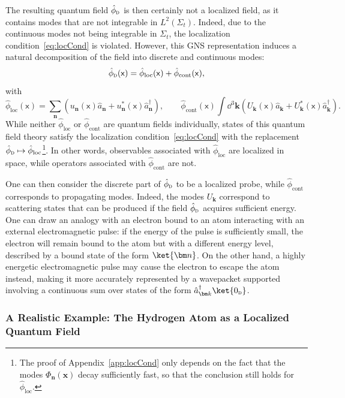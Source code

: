 \documentclass[letterpaper,12pt,titlepage,oneside,final]{book}
\newcommand{\mf}{\mathsf}%
\newcommand{\tc}[1]{\textsc{#1}}
\begin{document}
The resulting quantum field $\hat{\phi}_\tc{d}$ is then certainly not a localized field, as it contains modes that are not integrable in $L^2(\Sigma_t)$. Indeed, due to the continuous modes not being integrable in $\Sigma_t$, the localization condition~\eqref{eq:locCond} is violated. However, this GNS representation induces a natural decomposition of the field into discrete and continuous modes:
\begin{equation}
    \hat{\phi}_\tc{d}(\mf x) = \hat{\phi}_{\text{loc}}(\mf x) + \hat{\phi}_\text{cont}(\mf x),
\end{equation}
with
\begin{equation}
    \hat{\phi}_{\text{loc}}(\mf x) = \sum_{\bm n} \left(u_{\bm n}(\mf x) \hat{a}_{\bm n} + u_{\bm n}^*(\mf x) \hat{a}^\dagger_{\bm n}\right), \quad \quad \hat{\phi}_{\text{cont}}(\mf x) \int \dd^3 \bm k \left(U_{\bm k}(\mf x) \hat{a}_{\bm k} +U_{\bm k}^*(\mf x) \hat{a}^\dagger_{\bm k} \right).
\end{equation}
While neither $\hat{\phi}_\text{loc}$ or $\hat{\phi}_\text{cont}$ are quantum fields individually, states of this quantum field theory satisfy the localization condition~\eqref{eq:locCond} with the replacement $\hat{\phi}_\tc{d}\mapsto \hat{\phi}_\text{loc}$\footnote{The proof of Appendix~\ref{app:locCond} only depends on the fact that the modes $\Phi_{\bm n}(\bm x)$ decay sufficiently fast, so that the conclusion still holds for $\hat{\phi}_\text{loc}$.}. In other words, observables associated with $\hat{\phi}_\text{loc}$ are localized in space, while operators associated with $\hat{\phi}_\text{cont}$ are not.

One can then consider the discrete part of $\hat{\phi}_\tc{d}$ to be a localized probe, while $\hat{\phi}_\text{cont}$ corresponds to propagating modes. Indeed, the modes $U_{\bm k}$ correspond to scattering states that can be produced if the field $\hat{\phi}_\tc{d}$ acquires sufficient energy. One can draw an analogy with an electron bound to an atom interacting with an external electromagnetic pulse: if the energy of the pulse is sufficiently small, the electron will remain bound to the atom but with a different energy level, described by a bound state of the form $\ket{\bm n}$. On the other hand, a highly energetic electromagnetic pulse may cause the electron to escape the atom instead, making it more accurately represented by a wavepacket supported involving a continuous sum over states of the form $\hat{a}^\dagger_{\bm k}\ket{0_\tc{d}}$.


\subsubsection*{A Realistic Example: The Hydrogen Atom as a Localized Quantum Field}
\end{document}
